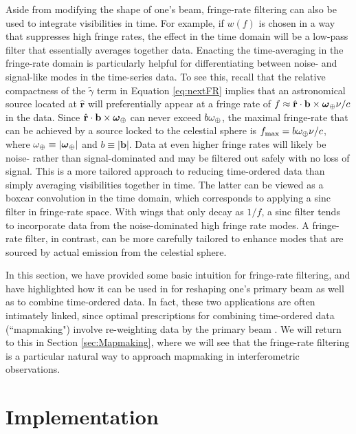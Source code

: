 \documentclass[twocolumn,apj,numberedappendix]{emulateapj}
\newcommand{\rhat}{\hat{\mathbf{r}}}
\begin{document}
Aside from modifying the shape of one's beam, fringe-rate filtering can also be used to integrate visibilities in time. For example, if $w(f)$ is chosen in a way that suppresses high fringe rates, the effect in the time domain will be a low-pass filter that essentially averages together data. Enacting the time-averaging in the fringe-rate domain is particularly helpful for differentiating between noise- and signal-like modes in the time-series data. To see this, recall that the relative compactness of the $\tilde{\gamma}$ term in Equation \eqref{eq:nextFR} implies that an astronomical source located at $\rhat$ will preferentially appear at a fringe rate of $f \approx \rhat \cdot \mathbf{b} \times \boldsymbol \omega_\Earth \nu / c $ in the data. Since $\rhat \cdot \mathbf{b} \times \boldsymbol \omega_\Earth$ can never exceed $b \omega_\oplus $, the maximal fringe-rate that can be achieved by a source locked to the celestial sphere is $f_\textrm{max} = b \omega_\oplus  \nu / c$, where $\omega_\oplus \equiv | \boldsymbol \omega_\oplus|$ and $b \equiv | \mathbf{b}|$. Data at even higher fringe rates will likely be noise- rather than signal-dominated and may be filtered out safely with no loss of signal. This is a more tailored approach to reducing time-ordered data than simply averaging visibilities together in time. The latter can be viewed as a boxcar convolution in the time domain, which corresponds to applying a sinc filter in fringe-rate space. With wings that only decay as $1/f$, a sinc filter tends to incorporate data from the noise-dominated high fringe rate modes. A fringe-rate filter, in contrast, can be more carefully tailored to enhance modes that are sourced by actual emission from the celestial sphere.

In this section, we have provided some basic intuition for fringe-rate filtering, and have highlighted how it can be used in for reshaping one's primary beam as well as to combine time-ordered data. In fact, these two applications are often intimately linked, since optimal prescriptions for combining time-ordered data (``mapmaking") involve re-weighting data by the primary beam \citep{T97mapmaking,Morales2009,dillon_et_al2015}. We will return to this in Section \ref{sec:Mapmaking}, where we will see that the fringe-rate filtering is a particular natural way to approach mapmaking in interferometric observations.




\section{Implementation}
\label{sec:Implementation}
\end{document}
